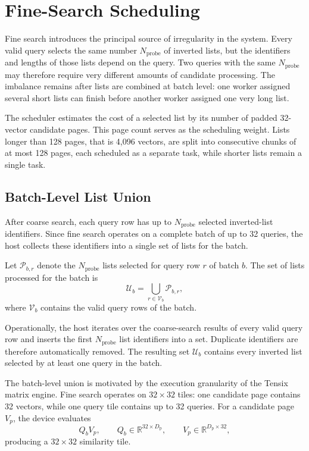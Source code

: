 \section{Fine-Search Scheduling}
\label{sec:fine-search-scheduling}

Fine search introduces the principal source of irregularity in the system. Every valid query selects the same number \(N_{\mathrm{probe}}\) of inverted lists, but the identifiers and lengths of those lists depend on the query. Two queries with the same \(N_{\mathrm{probe}}\) may therefore require very different amounts of candidate processing. The imbalance remains after lists are combined at batch level: one worker assigned several short lists can finish before another worker assigned one very long list.

The scheduler estimates the cost of a selected list by its number of padded 32-vector candidate pages. This page count serves as the scheduling weight. Lists longer than 128 pages, that is 4,096 vectors, are split into consecutive chunks of at most 128 pages, each scheduled as a separate task, while shorter lists remain a single task.

\subsection{Batch-Level List Union}
\label{subsec:batch-level-union}

After coarse search, each query row has up to \(N_{\mathrm{probe}}\) selected inverted-list identifiers. Since fine search operates on a complete batch of up to 32 queries, the host collects these identifiers into a single set of lists for the batch.

Let \(\mathcal{P}_{b,r}\) denote the \(N_{\mathrm{probe}}\) lists selected for query row \(r\) of batch \(b\). The set of lists processed for the batch is
\begin{equation}
\mathcal{U}_b
=
\bigcup_{r\in\mathcal{V}_b}
\mathcal{P}_{b,r},
\label{eq:batch-union}
\end{equation}
where \(\mathcal{V}_b\) contains the valid query rows of the batch.

Operationally, the host iterates over the coarse-search results of every valid query row and inserts the first \(N_{\mathrm{probe}}\) list identifiers into a set. Duplicate identifiers are therefore automatically removed. The resulting set \(\mathcal{U}_b\) contains every inverted list selected by at least one query in the batch.

The batch-level union is motivated by the execution granularity of the Tensix matrix engine. Fine search operates on \(32\times32\) tiles: one candidate page contains 32 vectors, while one query tile contains up to 32 queries. For a candidate page \(V_p\), the device evaluates
\begin{equation}
Q_bV_p,
\qquad
Q_b\in\mathbb{R}^{32\times D_{\mathrm{p}}},
\qquad
V_p\in\mathbb{R}^{D_{\mathrm{p}}\times32},
\end{equation}
producing a \(32\times32\) similarity tile.

